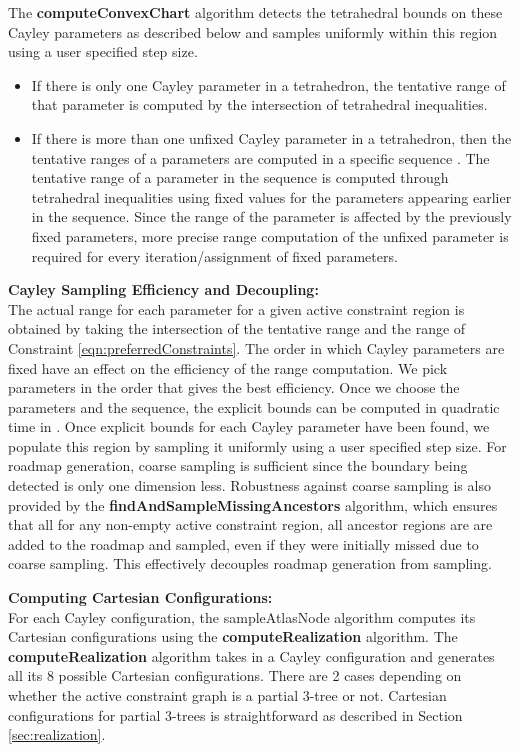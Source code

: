 \documentclass[]{article}
\newcommand{\ctwo}{\ref{eqn:preferredConstraints}}
\begin{document}
The \textbf{computeConvexChart} algorithm detects the tetrahedral bounds
on these Cayley parameters as described below and samples uniformly within this
region using a user specified step size.  

\begin{itemize} 

\item If there is only one Cayley parameter in a tetrahedron, the tentative
range of that parameter is computed by the intersection of tetrahedral
inequalities.

\item If there is more than one unfixed Cayley parameter in a tetrahedron,
then the tentative ranges of a parameters are computed in a specific sequence
\cite{ugandhar}. The tentative range of a parameter in the sequence is computed
through tetrahedral inequalities using fixed values for the parameters
appearing earlier in the sequence. Since the range of the parameter is affected
by the previously fixed parameters, more precise range computation of the
unfixed parameter is required for every iteration/assignment of fixed
parameters.  

\end{itemize}

\noindent \textbf{Cayley Sampling Efficiency and Decoupling:\\}
The actual range for each parameter for a given active constraint region is obtained by taking the intersection of
the tentative range and the range of Constraint \ctwo. The order
in which Cayley parameters are fixed have an effect on the efficiency of the
range computation. We pick parameters in the order that gives
the best efficiency\cite{ugandhar}. Once we choose the parameters  and the sequence, the
explicit bounds can be computed in quadratic time in .  Once explicit
bounds for each Cayley parameter have been found, we populate this region by
sampling it uniformly using a user specified step size. For roadmap generation,
coarse sampling is 
sufficient since the boundary being detected is only one dimension less.
Robustness against coarse sampling is also provided by the 
\textbf{findAndSampleMissingAncestors} algorithm, which ensures that all 
for any non-empty active constraint region, all ancestor regions are 
are added to the roadmap and sampled, even if they were initially missed 
due to coarse sampling. This effectively
decouples roadmap generation from sampling.

\noindent\textbf{Computing Cartesian Configurations:\\}
For each Cayley configuration, the sampleAtlasNode algorithm computes its
Cartesian configurations using the \textbf{computeRealization} algorithm.  The
\textbf{computeRealization} algorithm takes in a Cayley configuration and generates all
its 8 possible Cartesian configurations. There are 2 cases depending on
whether the active constraint graph is a partial 3-tree or not.  Cartesian
configurations for partial 3-trees is straightforward as described in Section
\ref{sec:realization}. 
\end{document}

